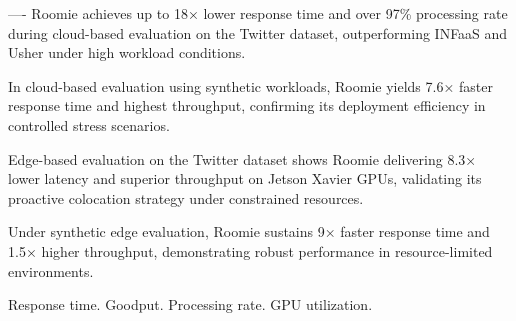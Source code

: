 ----
Roomie achieves up to 18× lower response time and over 97\% processing rate during cloud-based evaluation on the Twitter dataset, outperforming INFaaS and Usher under high workload conditions.

In cloud-based evaluation using synthetic workloads, Roomie yields 7.6× faster response time and highest throughput, confirming its deployment efficiency in controlled stress scenarios.

Edge-based evaluation on the Twitter dataset shows Roomie delivering 8.3× lower latency and superior throughput on Jetson Xavier GPUs, validating its proactive colocation strategy under constrained resources.

Under synthetic edge evaluation, Roomie sustains 9× faster response time and 1.5× higher throughput, demonstrating robust performance in resource-limited environments.




Response time.
Goodput.
Processing rate.
GPU utilization.
